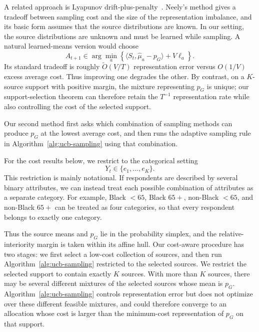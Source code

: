 \documentclass[twoside]{article}
\begin{document}
A related approach is Lyapunov drift-plus-penalty~\citep{neely2010stochastic}.
Neely's method gives a tradeoff between sampling cost and the size of the
representation imbalance, and its basic form assumes that the source
distributions are known. In our setting, the source distributions are unknown
and must be learned while sampling. A natural learned-means version would choose
\[
A_{t+1}\in\arg\min_a
\left\{\langle S_t,\widehat\mu_a-p_G\rangle+V\ell_a\right\}.
\]
Its standard tradeoff is roughly \(\widetilde O(V/T)\) representation error
versus \(O(1/V)\) excess average cost. Thus improving one degrades the other.
By contrast, on a \(K\)-source support with positive margin, the mixture
representing \(p_G\) is unique; our support-selection theorem can therefore
retain the \(T^{-1}\) representation rate while also controlling the cost of
the selected support.

Our second method first asks which combination of sampling methods can produce
\(p_G\) at the lowest average cost, and then runs the adaptive sampling rule in Algorithm~\ref{alg:ucb-sampling} 
using that combination.

For the cost results below, we restrict to the categorical setting
\[
Y_t\in\{e_1,\ldots,e_K\}.
\]
This restriction is mainly notational. If respondents are described by
several binary attributes, we can instead treat each possible combination of
attributes as a separate category. For example, Black \(<65\), Black \(65+\),
non-Black \(<65\), and non-Black \(65+\) can be treated as four categories,
so that every respondent belongs to exactly one category.

Thus the source means and \(p_G\) lie in the probability simplex, and the
relative-interiority margin is taken within its affine hull.
Our cost-aware procedure has two stages: we first select a low-cost
collection of sources, and then run Algorithm~\ref{alg:ucb-sampling}
restricted to the selected sources. 
We restrict the selected support to contain exactly \(K\) sources.
With more than \(K\) sources, there may be several different mixtures
of the selected sources whose mean is \(p_G\).
Algorithm~\ref{alg:ucb-sampling} controls representation error but does
not optimize over these different feasible mixtures, and could therefore
converge to an allocation whose cost is larger than the minimum-cost
representation of \(p_G\) on that support.
\end{document}
